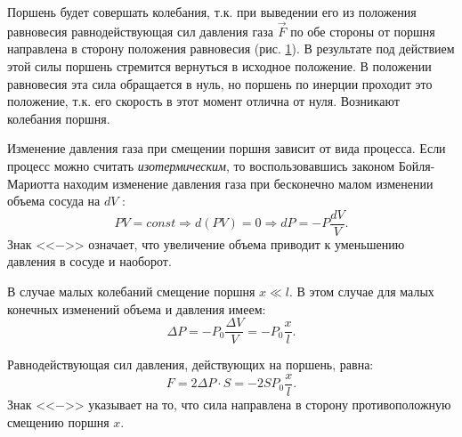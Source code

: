 \solving{}

\begin{figure}[htbp]
  \centering
  \caption{}
  \label{pistonOscillation}
\end{figure}

Поршень будет совершать колебания, т.к. при выведении его из положения
равновесия равнодействующая сил давления газа $\vec{F}$ по обе стороны от поршня направлена
в сторону положения равновесия (рис. \ref{pistonOscillation}). В результате под действием
этой силы поршень стремится вернуться в исходное положение. В положении
равновесия эта сила обращается в нуль, но поршень по инерции проходит
это положение, т.к. его скорость в этот момент отлична от нуля.
Возникают колебания поршня.

Изменение давления газа при смещении поршня зависит от вида процесса.
Если процесс можно считать \emph{изотермическим}, то воспользовавшись
законом Бойля-Мариотта находим изменение давления газа при бесконечно
малом изменении объема сосуда на $dV$ :
\begin{equation}
  PV = const \Rightarrow d(PV) = 0 \Rightarrow dP= -P\frac{dV}{V}.
\end{equation}
Знак <<$-$>> означает, что увеличение объема приводит к уменьшению
давления в сосуде и наоборот.

В случае малых колебаний смещение поршня $x \ll l$. В этом случае для малых конечных изменений объема и давления имеем:
\begin{equation}
  \Delta P = - P_0\frac{\Delta V}{V} = -P_0\frac{x}{l}.
\end{equation}

Равнодействующая сил давления, действующих на поршень, равна:
\begin{equation}
  F = 2\Delta P\cdot S = -2SP_0\frac{x}{l}.
\end{equation}
Знак <<$-$>> указывает на то, что сила направлена в сторону
противоположную смещению поршня $x$.

